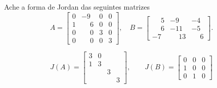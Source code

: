\documentclass[12pt]{exam}
\begin{document}
\begin{exercicio}
  Ache a forma de Jordan das seguintes matrizes
  \[
      A = \begin{bmatrix}
      0 & -9 & 0 & 0\\
      1 & \phantom{-} 6 & 0 & 0\\
      0 & \phantom{-} 0 & 3 & 0\\
      0 & \phantom{-} 0 & 0 & 3
    \end{bmatrix}, \quad B = \begin{bmatrix}
      \phantom{-} 5 & -9 & -4\\
      \phantom{-} 6 & -11 & -5\\
      -7 & \phantom{-} 13 & \phantom{-} 6
    \end{bmatrix}.
  \]
  \begin{solucao}
    \[
      J(A) = \begin{bmatrix}
        3 & 0\\
        1 & 3\\
        & & 3\\
        & & & 3
      \end{bmatrix}, \qquad J(B) = \begin{bmatrix}
        0 & 0 & 0\\
        1 & 0 & 0\\
        0 & 1 & 0
      \end{bmatrix}
    \]
  \end{solucao}
\end{exercicio}
\end{document}
